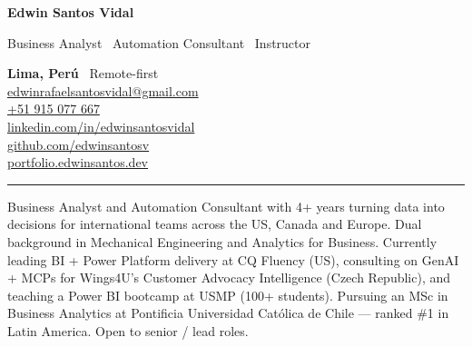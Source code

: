 \documentclass[10pt,letterpaper]{article}
\begin{document}
\pagestyle{empty}
\color{ink}

\noindent
\begin{minipage}[t]{0.58\linewidth}
  \vspace{0pt}
  {\Huge\bfseries Edwin Santos Vidal}\par
  \vspace{2pt}
  \textcolor{inkdim}{\normalsize Business Analyst \textperiodcentered\ Automation Consultant \textperiodcentered\ Instructor}
\end{minipage}%
\hfill
\begin{minipage}[t]{0.40\linewidth}
  \vspace{0pt}
  \raggedleft
  \textcolor{inkdim}{\small
    \textbf{\color{ink}Lima, Perú} \textperiodcentered\ Remote-first \\
    \href{mailto:edwinrafaelsantosvidal@gmail.com}{edwinrafaelsantosvidal@gmail.com} \\
    \href{tel:+51915077667}{+51 915 077 667} \\
    \href{https://www.linkedin.com/in/edwinsantosvidal/}{linkedin.com/in/edwinsantosvidal} \\
    \href{https://github.com/edwinsantosv}{github.com/edwinsantosv} \\
    \href{https://edwinsantosv.github.io/portfolio-v2.github.io/}{portfolio.edwinsantos.dev}
  }
\end{minipage}
\par\vspace{4pt}
\textcolor{ink}{\rule{\linewidth}{1.4pt}}

\vspace{6pt}
\noindent Business Analyst and Automation Consultant with 4+ years turning data into decisions for international teams across the US, Canada and Europe. Dual background in Mechanical Engineering and Analytics for Business. Currently leading BI + Power Platform delivery at CQ Fluency (US), consulting on GenAI + MCPs for Wings4U's Customer Advocacy Intelligence (Czech Republic), and teaching a Power BI bootcamp at USMP (100+ students). Pursuing an MSc in Business Analytics at Pontificia Universidad Católica de Chile — ranked \#1 in Latin America. Open to senior / lead roles.
\end{document}
